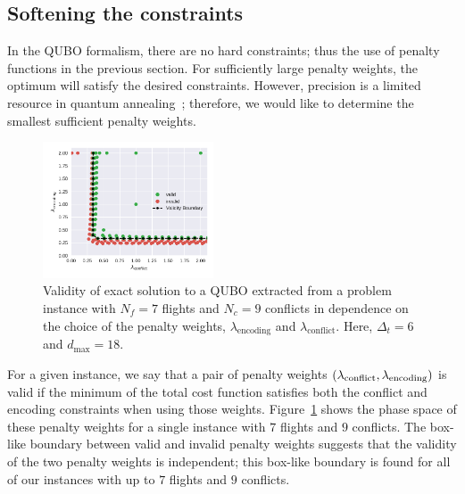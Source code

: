 \subsection{Softening the constraints}
In the QUBO formalism, there are no hard constraints; thus the use of penalty functions in the previous section.
For sufficiently large penalty weights, the optimum will satisfy the desired constraints.
However, precision is a limited resource in quantum annealing~\cite{TODO:D-Wave-precision}; therefore, we would like to determine the smallest sufficient penalty weights.

\begin{figure}[htpb]
\centering
\includegraphics[width=0.45\textwidth]{./pics/validity_boundary_example.pdf}
\caption[Penalty weight phase diagram]{Validity of exact solution to a QUBO extracted from a problem instance with $N_f=7$ flights and $N_c=9$ conflicts in dependence on the choice of the penalty weights, $\lambda_\text{encoding}$ and $\lambda_\text{conflict}$. Here, $\Delta_t=6$ and $d_\text{max}=18$.}
\label{fig:penalty_weights}
\end{figure}

For a given instance, we say that a pair of penalty weights $(\lambda_{\mathrm{conflict}}, \lambda_{\mathrm{encoding}})$ is valid if the minimum of the total cost function satisfies both the conflict and encoding constraints when using those weights.
Figure~\ref{fig:penalty_weights} shows the phase space of these penalty weights for a single instance with $7$ flights and $9$ conflicts.
The box-like boundary between valid and invalid penalty weights suggests that the validity of the two penalty weights is independent; 
this box-like boundary is found for all of our instances with up to $7$ flights and $9$ conflicts.

